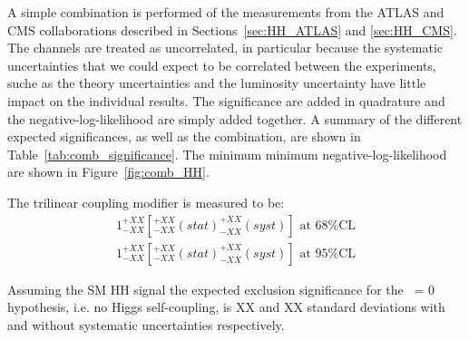 A simple combination is performed of the measurements from the ATLAS and CMS collaborations described in Sections~\ref{sec:HH_ATLAS} and \ref{sec:HH_CMS}.
The channels are treated as uncorrelated, in particular because the systematic uncertainties that we could expect to be correlated between the experiments, suche as the theory uncertainties and the luminosity uncertainty have little impact on the individual results.
The significance are added in quadrature and the negative-log-likelihood are simply added together. A summary of the different expected significances, as well as the combination, are shown in Table~\ref{tab:comb_significance}. The minimum minimum negative-log-likelihood are shown in Figure~\ref{fig:comb_HH}.

The trilinear coupling modifier is measured to be:
\[
\begin{split}
1^{+XX}_{-XX} [^{+XX}_{-XX} (stat) ^{+XX}_{-XX} (syst)] \text{ at 68\% CL} \\
1^{+XX}_{-XX} [^{+XX}_{-XX} (stat) ^{+XX}_{-XX} (syst)] \text{ at 95\% CL}
\end{split}
\]

Assuming the SM HH signal the expected exclusion significance for the \kl\ = 0 hypothesis, i.e. no Higgs self-coupling, is XX and XX standard deviations with and without systematic uncertainties respectively.




